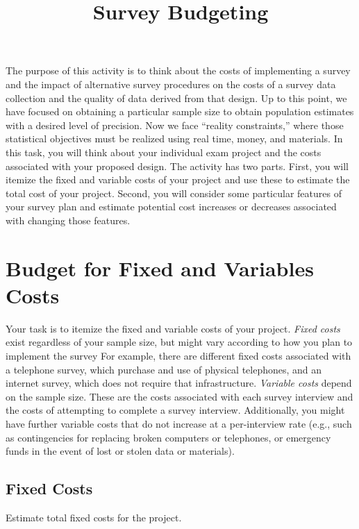 \documentclass[12pt, a4]{article}
\title{Survey Budgeting\vspace{-2em}}
\author{}
\date{}
\begin{document}
\maketitle

\noindent The purpose of this activity is to think about the costs of implementing a survey and the impact of alternative survey procedures on the costs of a survey data collection and the quality of data derived from that design. Up to this point, we have focused on obtaining a particular sample size to obtain population estimates with a desired level of precision. Now we face ``reality constraints,'' where those statistical objectives must be realized using real time, money, and materials. In this task, you will think about your individual exam project and the costs associated with your proposed design. The activity has two parts. First, you will itemize the fixed and variable costs of your project and use these to estimate the total cost of your project. Second, you will consider some particular features of your survey plan and estimate potential cost increases or decreases associated with changing those features.

\section{Budget for Fixed and Variables Costs}

\noindent Your task is to itemize the fixed and variable costs of your project. \textit{Fixed costs} exist regardless of your sample size, but might vary according to how you plan to implement the survey For example, there are different fixed costs associated with a telephone survey, which purchase and use of physical telephones, and an internet survey, which does not require that infrastructure. \textit{Variable costs} depend on the sample size. These are the costs associated with each survey interview and the costs of attempting to complete a survey interview. Additionally, you might have further variable costs that do not increase at a per-interview rate (e.g., such as contingencies for replacing broken computers or telephones, or emergency funds in the event of lost or stolen data or materials).

\subsection{Fixed Costs}

\noindent Estimate total fixed costs for the project.
\end{document}
